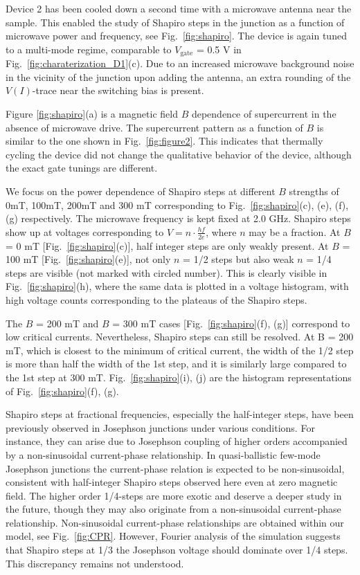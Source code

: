 Device 2 has been cooled down a second time with a microwave antenna near the sample.
This enabled the study of Shapiro steps in the junction as a function of microwave power and frequency, see Fig.~\ref{fig:shapiro}.
The device is again tuned to a multi-mode regime, comparable to $V_\mathrm{gate}$ = 0.5 V in Fig.~\ref{fig:charaterization_D1}(c).
Due to an increased microwave background noise in the vicinity of the junction upon adding the antenna, an extra rounding of the $V\left(I\right)$-trace near the switching bias is present.

Figure \ref{fig:shapiro}(a) is a magnetic field $B$ dependence of supercurrent in the absence of microwave drive.
The supercurrent pattern as a function of $B$ is similar to the one shown in Fig.~\ref{fig:figure2}.
This indicates that thermally cycling the device did not change the qualitative behavior of the device, although the exact gate tunings are different.

We focus on the power dependence of Shapiro steps at different $B$ strengths of 0mT, 100mT, 200mT and 300 mT corresponding to Fig.~\ref{fig:shapiro}(c), (e), (f), (g) respectively.
The microwave frequency is kept fixed at 2.0 GHz.
Shapiro steps show up at voltages corresponding to $V=n\cdot\frac{hf}{2e}$, where $n$ may be a fraction.
At $B$ = 0 mT [Fig.~\ref{fig:shapiro}(c)], half integer steps are only weakly present.
At $B$ = 100 mT [Fig.~\ref{fig:shapiro}(e)], not only $n$ = 1/2 steps but also weak $n$ = 1/4 steps are visible (not marked with circled number).
This is clearly visible in Fig.~\ref{fig:shapiro}(h), where the same data is plotted in a voltage histogram, with high voltage counts corresponding to the plateaus of the Shapiro steps.

The $B$ = 200 mT and $B$ = 300 mT cases [Fig.~\ref{fig:shapiro}(f), (g)] correspond to low critical currents.
Nevertheless, Shapiro steps can still be resolved.
At B = 200 mT, which is closest to the minimum of critical current, the width of the 1/2 step is more than half the width of the 1st step, and it is similarly large compared to the 1st step at 300 mT.
Fig.~\ref{fig:shapiro}(i), (j) are the histogram representations of Fig.~\ref{fig:shapiro}(f), (g).

Shapiro steps at fractional frequencies, especially the half-integer steps, have been previously observed in Josephson junctions under various conditions\cite{Lehnert1999,Dubos2001, Dinsmore2008,Sellier2004,Chauvin2006}.
For instance, they can arise due to Josephson coupling of higher orders accompanied by a non-sinusoidal current-phase relationship\cite{Radovic2001}.
In quasi-ballistic few-mode Josephson junctions the current-phase relation is expected to be non-sinusoidal, consistent with half-integer Shapiro steps observed here even at zero magnetic field.
The higher order 1/4-steps are more exotic and deserve a deeper study in the future, though they may also originate from a non-sinusoidal current-phase relationship.
Non-sinusoidal current-phase relationships are obtained within our model, see Fig.~\ref{fig:CPR}.
However, Fourier analysis of the simulation suggests that Shapiro steps at 1/3 the Josephson voltage should dominate over 1/4 steps.
This discrepancy remains not understood.


